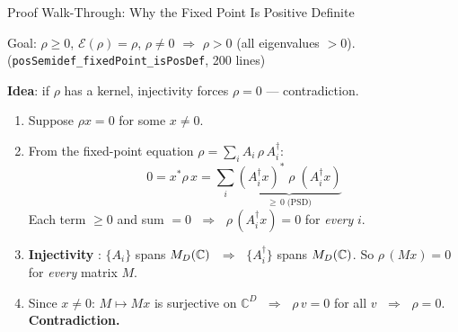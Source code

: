 \documentclass[aspectratio=169,10pt]{beamer}
\begin{document}
\begin{frame}{Proof Walk-Through: Why the Fixed Point Is Positive Definite}
    \vspace{-0.7em}

    {\small\textcolor{dimwhite}{Goal: $\rho \geq 0$, $\mathcal{E}(\rho) = \rho$,
    $\rho \neq 0$ $\Longrightarrow$ $\rho > 0$ (all eigenvalues $> 0$).
    \quad(\texttt{posSemidef\_fixedPoint\_isPosDef}, 200 lines)}}

    \vspace{0.3em}
    \textbf{Idea}: if $\rho$ has a kernel, injectivity forces $\rho = 0$ --- contradiction.

    \begin{enumerate}\itemsep0.05em\small
        \item Suppose $\rho x = 0$ for some $x \neq 0$.

        \item From the fixed-point equation $\rho = \sum_i A_i\,\rho\, A_i^\dagger$:
            \vspace{-0.3em}
            \[
                0 = x^*\rho\, x = \sum_i \underbrace{(A_i^\dagger x)^*\;\rho\; (A_i^\dagger x)}_{\geq\, 0\;\text{(PSD)}}
            \]
            \vspace{-0.6em}
            Each term $\geq 0$ and sum $= 0$
            $\;\Rightarrow\;$ $\rho\,(A_i^\dagger x) = 0$ for \emph{every} $i$.

        \item \textbf{Injectivity} \cite{Perez-Garcia2007Matrix}: $\{A_i\}$ spans $M_D(\mathbb{C})$
            $\;\Rightarrow\;$ $\{A_i^\dagger\}$ spans $M_D(\mathbb{C})$.
            So $\rho\,(M x) = 0$ for \emph{every} matrix $M$.

        \item Since $x \neq 0$: $M \mapsto Mx$ is surjective on $\mathbb{C}^D$
            $\;\Rightarrow\;$ $\rho\, v = 0$ for all $v$
            $\;\Rightarrow\;$ $\rho = 0$.  \textbf{Contradiction.}
    \end{enumerate}

    \vspace{0.1em}
    \begin{center}
    \end{center}
\end{frame}
\end{document}
